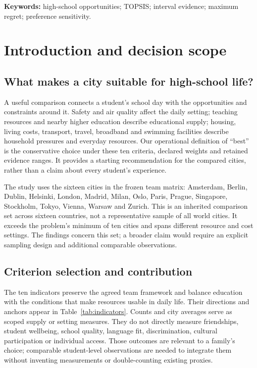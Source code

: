 \textbf{Keywords:} high-school opportunities; TOPSIS; interval evidence;
maximum regret; preference sensitivity.
\clearpage
\tableofcontents
\clearpage
\section{Introduction and decision scope}
\subsection{What makes a city suitable for high-school life?}
A useful comparison connects a student's school day with the opportunities and
constraints around it. Safety and air quality affect the daily setting; teaching
resources and nearby higher education describe educational supply; housing,
living costs, transport, travel, broadband and swimming facilities describe
household pressures and everyday resources. Our operational definition of
``best'' is the conservative choice under these ten criteria, declared weights
and retained evidence ranges. It provides a starting recommendation for the
compared cities, rather than a claim about every student's experience.

The study uses the sixteen cities in the frozen team matrix: Amsterdam, Berlin,
Dublin, Helsinki, London, Madrid, Milan, Oslo, Paris, Prague, Singapore,
Stockholm, Tokyo, Vienna, Warsaw and Zurich. This is an inherited comparison
set across sixteen countries, not a representative sample of all world cities.
It exceeds the problem's minimum of ten cities and spans different resource
and cost settings. The findings concern this set; a broader claim would require
an explicit sampling design and additional comparable observations.

\subsection{Criterion selection and contribution}
The ten indicators preserve the agreed team framework and balance education
with the conditions that make resources usable in daily life. Their directions
and anchors appear in Table~\ref{tab:indicators}. Counts and city averages serve
as scoped supply or setting measures. They do not directly measure friendships,
student wellbeing, school quality, language fit, discrimination, cultural
participation or individual access. Those outcomes are relevant to a family's
choice; comparable student-level observations are needed to integrate them
without inventing measurements or double-counting existing proxies.

